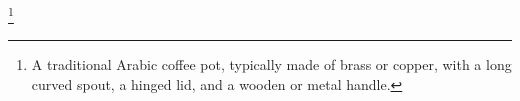 \footnote{A traditional Arabic coffee pot, typically made of brass or copper, with a long curved spout, a hinged lid, and a wooden or metal handle.}